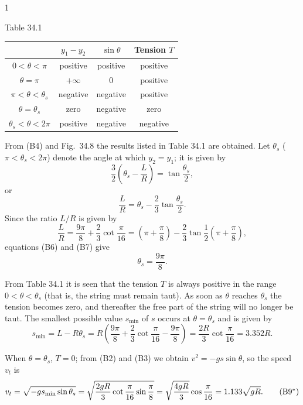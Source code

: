 \begin{solution}{1}
\begin{center}
\small Table 34.1
\end{center}
\begin{center}
\begin{tabular}{cccc}
\toprule
 & $y_1-y_2$ & $\sin\theta$ & Tension $T$\\
\midrule
$0<\theta<\pi$ & positive & positive & positive\\
$\theta=\pi$ & $+\infty$ & $0$ & positive\\
$\pi<\theta<\theta_s$ & negative & negative & positive\\
$\theta=\theta_s$ & zero & negative & zero\\
$\theta_s<\theta<2\pi$ & positive & negative & negative\\
\bottomrule
\end{tabular}
\end{center}

From (B4) and Fig.~34.8 the results listed in Table 34.1 are obtained. Let $\theta_s$ ($\pi<\theta_s<2\pi$) denote the angle at which $y_2=y_1$; it is given by
\begin{equation}
\frac{3}{2}\left(\theta_s-\frac{L}{R}\right)=\tan\frac{\theta_s}{2}, \tag{B5}
\end{equation}
or
\begin{equation}
\frac{L}{R}=\theta_s-\frac{2}{3}\tan\frac{\theta_s}{2}. \tag{B6}
\end{equation}
Since the ratio $L/R$ is given by
\begin{equation}
\frac{L}{R}=\frac{9\pi}{8}+\frac{2}{3}\cot\frac{\pi}{16}
=\left(\pi+\frac{\pi}{8}\right)-\frac{2}{3}\tan\frac{1}{2}\left(\pi+\frac{\pi}{8}\right), \tag{B7}
\end{equation}
equations (B6) and (B7) give
\[
\theta_s=\frac{9\pi}{8}.
\]

From Table 34.1 it is seen that the tension $T$ is always positive in the range $0<\theta<\theta_s$ (that is, the string must remain taut). As soon as $\theta$ reaches $\theta_s$ the tension becomes zero, and thereafter the free part of the string will no longer be taut. The smallest possible value $s_{\min}$ of $s$ occurs at $\theta=\theta_s$ and is given by
\begin{equation}
s_{\min}=L-R\theta_s=R\left(\frac{9\pi}{8}+\frac{2}{3}\cot\frac{\pi}{16}-\frac{9\pi}{8}\right)
=\frac{2R}{3}\cot\frac{\pi}{16}=3.352R . \tag{B8}
\end{equation}

When $\theta=\theta_s$, $T=0$; from (B2) and (B3) we obtain $v^2=-gs\sin\theta$, so the speed $v_t$ is
\begin{equation}
v_t=\sqrt{-gs_{\min}\sin\theta_s}
=\sqrt{\frac{2gR}{3}\cot\frac{\pi}{16}\sin\frac{\pi}{8}}
=\sqrt{\frac{4gR}{3}}\cos\frac{\pi}{16}=1.133\sqrt{gR}. \tag{B9$^{*}$}
\end{equation}


\end{solution}
